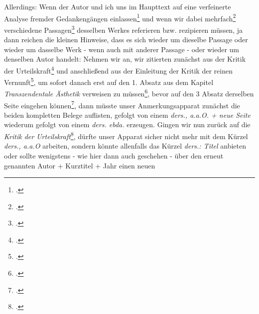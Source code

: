 Allerdings: Wenn der Autor und ich uns im Haupttext auf eine verfeinerte Analyse
fremder Gedankengängen einlassen\footcite[vgl. etwa][32]{Allen2001a} und wenn
wir dabei mehrfach\footcite[vgl.][139]{Allen2001a} verschiedene
Passagen\footcite[vgl.][139]{Allen2001a} desselben Werkes referieren bzw.
rezipieren müssen, ja dann reichen die kleinen Hinweise, dass es sich wieder um
dieselbe Passage oder wieder um dasselbe Werk - wenn auch mit anderer Passage -
oder wieder um denselben Autor handelt: Nehmen wir an, wir zitierten zunächst
aus der Kritik der Urteilskraft\footcite[vgl.][9]{KantKdU1974} und
anschließend aus der Einleitung der Kritik der reinen
Vernunft\footcite[vgl.][45]{KantKdV1974}, um sofort danach erst auf den 1.
Absatz aus dem Kapitel \emph{Transzendentale Ästhetik} verweisen zu
müssen\footcite[vgl.][69]{KantKdV1974}, bevor auf den 3 Absatz derselben Seite
eingehen können\footcite[vgl.][69]{KantKdV1974}, dann müsste unser
Anmerkungsapparat zunächst die beiden kompletten Belege auflisten, gefolgt von
einem \emph{ders., a.a.O. + neue Seite} wiederum gefolgt von einem \emph{ders.
ebda.} erzeugen. Gingen wir nun zurück auf die \emph{Kritik der
Urteilskraft}\footcite[vgl.][9]{KantKdU1974}, dürfte unser Apparat sicher nicht
mehr mit dem Kürzel \emph{ders., a.a.O} arbeiten, sondern könnte allenfalls das
Kürzel \emph{ders.: Titel} anbieten oder sollte wenigstens - wie hier dann auch
geschehen - über den erneut genannten Autor + Kurztitel + Jahr einen neuen
